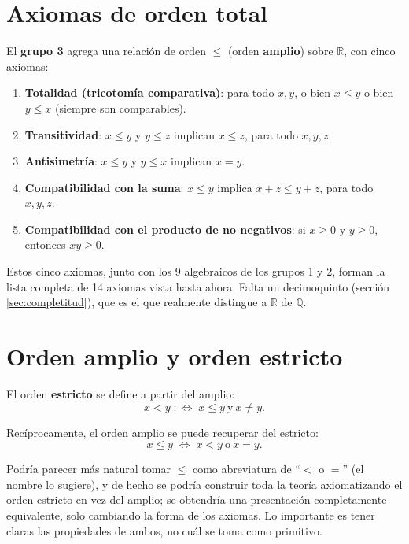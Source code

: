 \documentclass[12pt,a4paper]{article}
\begin{document}
\section{Axiomas de orden total}

El \textbf{grupo 3} agrega una relación de orden $\leq$ (orden
\textbf{amplio}) sobre $\mathbb{R}$, con cinco axiomas:

\begin{enumerate}
  \item \textbf{Totalidad (tricotomía comparativa)}: para todo $x,y$, o bien
    $x \leq y$ o bien $y \leq x$ (siempre son comparables).
  \item \textbf{Transitividad}: $x \leq y$ y $y \leq z$ implican $x \leq z$,
    para todo $x,y,z$.
  \item \textbf{Antisimetría}: $x \leq y$ y $y \leq x$ implican $x = y$.
  \item \textbf{Compatibilidad con la suma}: $x \leq y$ implica
    $x + z \leq y + z$, para todo $x,y,z$.
  \item \textbf{Compatibilidad con el producto de no negativos}: si
    $x \geq 0$ y $y \geq 0$, entonces $xy \geq 0$.
\end{enumerate}

Estos cinco axiomas, junto con los 9 algebraicos de los grupos 1 y 2, forman
la lista completa de 14 axiomas vista hasta ahora. Falta un decimoquinto
(sección \ref{sec:completitud}), que es el que realmente distingue a
$\mathbb{R}$ de $\mathbb{Q}$.

\section{Orden amplio y orden estricto}

El orden \textbf{estricto} se define a partir del amplio:
$$x < y \; :\Longleftrightarrow\; x \leq y \ \text{y} \ x \neq y.$$

Recíprocamente, el orden amplio se puede recuperar del estricto:
$$x \leq y \; \Longleftrightarrow\; x < y \ \text{o} \ x = y.$$

\begin{notebox}
Podría parecer más natural tomar $\leq$ como abreviatura de ``$<$ o $=$''
(el nombre lo sugiere), y de hecho se podría construir toda la teoría
axiomatizando el orden estricto en vez del amplio; se obtendría una
presentación completamente equivalente, solo cambiando la forma de los
axiomas. Lo importante es tener claras las propiedades de ambos, no cuál se
toma como primitivo.
\end{notebox}
\end{document}
